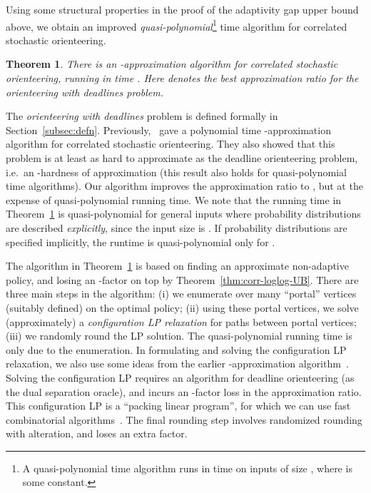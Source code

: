 \documentclass[11pt,letterpaper]{article}
\newtheorem{theorem}{Theorem}[section]
\numberwithin{algorithm}{section}
\begin{document}
Using some structural properties in the proof of the adaptivity gap upper bound above, we obtain an improved {\em quasi-polynomial}\footnote{A quasi-polynomial time algorithm runs in  time on inputs of size , where  is some constant.} time algorithm for correlated stochastic orienteering.
\begin{theorem}\label{thm:corr-NA}
There is an -approximation algorithm for correlated stochastic orienteering, running in time . Here  denotes the best approximation ratio for the orienteering with deadlines problem.
\end{theorem}
The {\em orienteering with deadlines} problem is defined formally in Section~\ref{subsec:defn}.
Previously,~\cite{GKNR12} gave a  polynomial time -approximation algorithm for correlated stochastic orienteering. They also showed that this problem is at least as hard to approximate as the deadline orienteering problem, i.e.~an -hardness of approximation (this result also holds for quasi-polynomial time algorithms). Our algorithm improves the approximation ratio to , but at the expense of quasi-polynomial running time. We note that the running time in Theorem~\ref{thm:corr-NA} is quasi-polynomial for general inputs where probability distributions are described {\em explicitly}, since the input size is . If probability distributions are specified implicitly, the runtime is quasi-polynomial only for .


The algorithm in Theorem~\ref{thm:corr-NA} is based on finding an approximate non-adaptive policy, and losing an -factor on top by Theorem~\ref{thm:corr-loglog-UB}. There are three main steps in the algorithm: (i) we enumerate over  many ``portal'' vertices (suitably defined) on the optimal policy; (ii) using these portal vertices, we solve (approximately) a {\em configuration LP relaxation} for paths between portal vertices; (iii) we randomly round the LP solution. The quasi-polynomial running time is only due to the enumeration. In formulating and solving the configuration LP relaxation, we also use some ideas from the earlier -approximation algorithm~\cite{GKNR12}. Solving the configuration LP requires an algorithm for deadline orienteering (as the dual separation oracle), and incurs an -factor loss in the approximation ratio.
This configuration LP is a ``packing linear program'', for which we can use fast combinatorial algorithms~\cite{PST91,GK07}. The final rounding step involves randomized rounding with alteration, and loses an extra  factor.
\end{document}
